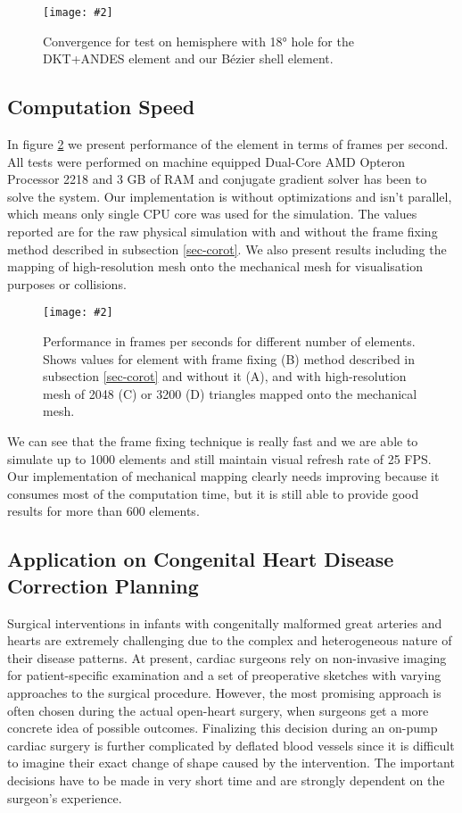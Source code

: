 \documentclass{egpubl}
\newcommand{\Figure}[3]{%
\begin{figure}[htb]
  \centering
  \texttt{[image: \#2]}
  \caption{\label{fig-#2}#3}
\end{figure}}
\begin{document}
\Figure{\linewidth}{hemisphere}
{Convergence for test on hemisphere with 18° hole for the DKT+ANDES element and
our B\'ezier shell element.}

\subsection{Computation Speed}

In figure \ref{fig-fps} we present performance of the element in terms of
frames per second. All tests were performed on machine equipped Dual-Core
AMD Opteron Processor 2218 and 3 GB of RAM and conjugate gradient solver
has been to solve the system. Our implementation is without optimizations
and isn't parallel, which means only single CPU core was used for the
simulation. The values reported are for the raw physical simulation with
and without the frame fixing method described in subsection
\ref{sec-corot}. We also present results including the mapping of
high-resolution mesh onto the mechanical mesh for visualisation purposes or
collisions.

\Figure{\linewidth}{fps}
{Performance in frames per seconds for different number of elements. Shows
values for element with frame fixing (B) method described in subsection
\ref{sec-corot} and without it (A), and with high-resolution mesh of 2048
(C) or 3200 (D) triangles mapped onto the mechanical mesh.}

We can see that the frame fixing technique is really fast and we are able
to simulate up to 1000 elements and still maintain visual refresh rate of
25 FPS. Our implementation of mechanical mapping clearly needs improving
because it consumes most of the computation time, but it is still able to
provide good results for more than 600 elements.

\subsection{Application on Congenital Heart Disease Correction Planning}

Surgical interventions in infants with congenitally malformed great arteries
and hearts are extremely challenging due to the complex and heterogeneous
nature of their disease patterns. At present, cardiac surgeons rely on
non-invasive imaging for patient-specific examination and a set of preoperative
sketches with varying approaches to the surgical procedure. However, the most
promising approach is often chosen during the actual open-heart surgery, when
surgeons get a more concrete idea of possible outcomes. Finalizing this
decision during an on-pump cardiac surgery is further complicated by deflated
blood vessels since it is difficult to imagine their exact change of shape
caused by the intervention. The important decisions have to be made in very
short time and are strongly dependent on the surgeon's experience.
\end{document}
